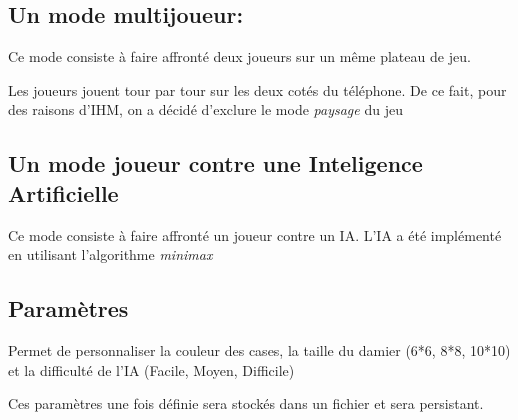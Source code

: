 \documentclass{article}
\begin{document}
\subsection{Un mode multijoueur:}

Ce mode consiste à faire affronté deux joueurs sur un même plateau de jeu.

Les joueurs jouent tour par tour sur les deux cotés du téléphone. 
De ce fait, pour des raisons d'IHM, on a décidé d'exclure le mode \textit{paysage} du jeu

\subsection{Un mode joueur contre une Inteligence Artificielle}

Ce mode consiste à faire affronté un joueur contre un IA.
L'IA a été implémenté en utilisant l'algorithme \textit{minimax}~\cite{miniMax}

\subsection{Paramètres}
Permet de personnaliser la couleur des cases, la taille du damier (6*6, 8*8, 10*10) 
et la difficulté de l'IA (Facile, Moyen, Difficile)

Ces paramètres une fois définie sera stockés dans un fichier et sera persistant.
\end{document}
